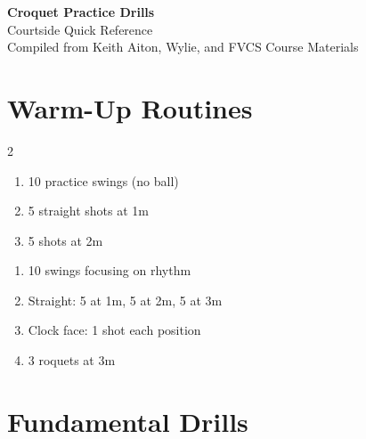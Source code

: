 \documentclass[11pt,a4paper]{article}
\begin{document}
\begin{center}
{\Huge\bfseries\color{hoopcolor} Croquet Practice Drills}\\[0.3em]
{\large Courtside Quick Reference}\\[0.5em]
{\small Compiled from Keith Aiton, Wylie, and FVCS Course Materials}
\end{center}

\vspace{0.5em}

\section{Warm-Up Routines}

\begin{multicols}{2}

\begin{tcolorbox}[drillbox, title={\color{warmupcolor}\faStopwatch~5-Minute Quick}]
\begin{enumerate}
    \item 10 practice swings (no ball)
    \item 5 straight shots at 1m
    \item 5 shots at 2m
\end{enumerate}
\end{tcolorbox}

\begin{tcolorbox}[drillbox, title={\color{warmupcolor}\faStopwatch~10-Minute Full}]
\begin{enumerate}
    \item 10 swings focusing on rhythm
    \item Straight: 5 at 1m, 5 at 2m, 5 at 3m
    \item Clock face: 1 shot each position
    \item 3 roquets at 3m
\end{enumerate}
\end{tcolorbox}

\end{multicols}

\section{Fundamental Drills}
\end{document}
